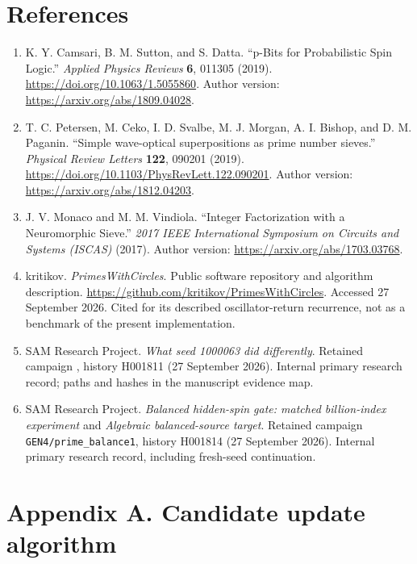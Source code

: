 \documentclass[
  11pt,
]{article}
\providecommand{\tightlist}{%
  \setlength{\itemsep}{0pt}\setlength{\parskip}{0pt}}
\begin{document}
\section{References}\label{references}

\begin{enumerate}
\def\labelenumi{\arabic{enumi}.}
\tightlist
\item
  K. Y. Camsari, B. M. Sutton, and S. Datta. ``p-Bits for Probabilistic
  Spin Logic.'' \emph{Applied Physics Reviews} \textbf{6}, 011305
  (2019). \url{https://doi.org/10.1063/1.5055860}. Author version:
  \url{https://arxiv.org/abs/1809.04028}.
\item
  T. C. Petersen, M. Ceko, I. D. Svalbe, M. J. Morgan, A. I. Bishop, and
  D. M. Paganin. ``Simple wave-optical superpositions as prime number
  sieves.'' \emph{Physical Review Letters} \textbf{122}, 090201 (2019).
  \url{https://doi.org/10.1103/PhysRevLett.122.090201}. Author version:
  \url{https://arxiv.org/abs/1812.04203}.
\item
  J. V. Monaco and M. M. Vindiola. ``Integer Factorization with a
  Neuromorphic Sieve.'' \emph{2017 IEEE International Symposium on
  Circuits and Systems (ISCAS)} (2017). Author version:
  \url{https://arxiv.org/abs/1703.03768}.
\item
  kritikov. \emph{PrimesWithCircles}. Public software repository and
  algorithm description.
  \url{https://github.com/kritikov/PrimesWithCircles}. Accessed 27
  September 2026. Cited for its described oscillator-return recurrence,
  not as a benchmark of the present implementation.
\item
  SAM Research Project. \emph{What seed 1000063 did differently}.
  Retained campaign \texttt{}, history
  H001811 (27 September 2026). Internal primary research record; paths
  and hashes in the manuscript evidence map.
\item
  SAM Research Project. \emph{Balanced hidden-spin gate: matched
  billion-index experiment} and \emph{Algebraic balanced-source target}.
  Retained campaign \texttt{GEN4/prime\_balance1}, history H001814 (27
  September 2026). Internal primary research record, including
  fresh-seed continuation.
\end{enumerate}

\section{Appendix A. Candidate update
algorithm}\label{appendix-a.-candidate-update-algorithm}
\end{document}
